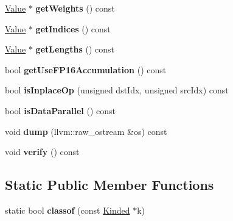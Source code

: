 \begin{DoxyCompactItemize}
\hyperlink{classglow_1_1_value}{Value} $\ast$ {\bfseries get\+Weights} () const
\item 
\mbox{\label{classglow_1_1_rowwise_quantized_sparse_lengths_weighted_sum_inst_a0cbdd64288d65aab2efbc33e74589e83}} 
\hyperlink{classglow_1_1_value}{Value} $\ast$ {\bfseries get\+Indices} () const
\item 
\mbox{\label{classglow_1_1_rowwise_quantized_sparse_lengths_weighted_sum_inst_a62cc2570176e824d30d81530e48329de}} 
\hyperlink{classglow_1_1_value}{Value} $\ast$ {\bfseries get\+Lengths} () const
\item 
\mbox{\label{classglow_1_1_rowwise_quantized_sparse_lengths_weighted_sum_inst_ab88af73f702a24a253e0346603d3198b}} 
bool {\bfseries get\+Use\+F\+P16\+Accumulation} () const
\item 
\mbox{\label{classglow_1_1_rowwise_quantized_sparse_lengths_weighted_sum_inst_a81a9541f34aa69c88784ef3de64ad435}} 
bool {\bfseries is\+Inplace\+Op} (unsigned dst\+Idx, unsigned src\+Idx) const
\item 
\mbox{\label{classglow_1_1_rowwise_quantized_sparse_lengths_weighted_sum_inst_a6a8652db83dee974b4ae6e2fde369692}} 
bool {\bfseries is\+Data\+Parallel} () const
\item 
\mbox{\label{classglow_1_1_rowwise_quantized_sparse_lengths_weighted_sum_inst_a95efaa65278fe260eb82b949630e2f9c}} 
void {\bfseries dump} (llvm\+::raw\+\_\+ostream \&os) const
\item 
\mbox{\label{classglow_1_1_rowwise_quantized_sparse_lengths_weighted_sum_inst_a7b7078dcdd3962555c1f2a8391a25290}} 
void {\bfseries verify} () const
\end{DoxyCompactItemize}
\subsection*{Static Public Member Functions}
\begin{DoxyCompactItemize}
\item 
\mbox{\label{classglow_1_1_rowwise_quantized_sparse_lengths_weighted_sum_inst_a117363dbba9d99297c40766ab0251130}} 
static bool {\bfseries classof} (const \hyperlink{classglow_1_1_kinded}{Kinded} $\ast$k)
\end{DoxyCompactItemize}
